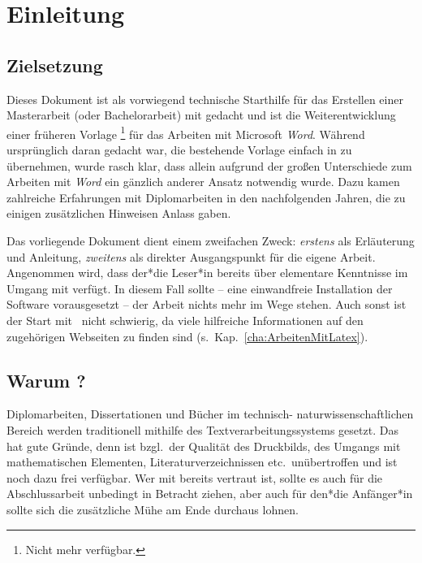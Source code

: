 \chapter{Einleitung}
\label{cha:Einleitung}


\section{Zielsetzung}

Dieses Dokument ist als vorwiegend technische Starthilfe für das Erstellen
einer Masterarbeit (oder Bachelorarbeit) mit \latex gedacht und ist die
Weiterentwicklung einer früheren Vorlage%
\footnote{Nicht mehr verfügbar.}
für das Arbeiten mit Microsoft \emph{Word}. Während ursprünglich daran
gedacht war, die bestehende Vorlage einfach in \latex zu übernehmen, wurde
rasch klar, dass allein aufgrund der großen Unterschiede zum Arbeiten mit
\emph{Word} ein gänzlich anderer Ansatz notwendig wurde. Dazu kamen
zahlreiche Erfahrungen mit Diplomarbeiten in den nachfolgenden Jahren, die zu
einigen zusätzlichen Hinweisen Anlass gaben.

Das vorliegende Dokument dient einem zweifachen Zweck: \emph{erstens} als
Erläuterung und Anleitung, \emph{zweitens} als direkter Ausgangspunkt für die
eigene Arbeit. Angenommen wird, dass der*die Leser*in bereits über elementare
Kenntnisse im Umgang mit \latex verfügt. In diesem Fall sollte -- eine
einwandfreie Installation der Software vorausgesetzt -- der Arbeit nichts
mehr im Wege stehen. Auch sonst ist der Start mit \latex\ nicht schwierig, da
viele hilfreiche Informationen auf den zugehörigen Webseiten zu finden sind
(s.\ Kap.~\ref{cha:ArbeitenMitLatex}).


\section{Warum {\latex}?}

Diplomarbeiten, Dissertationen und Bücher im technisch-%
natur\-wissen\-schaft\-lichen Bereich werden traditionell mithilfe
des Textverarbeitungssystems \latex \cite{Lamport1994, Lamport1995} gesetzt.
Das hat gute Gründe, denn \latex ist bzgl.\ der Qualität des Druckbilds, des
Umgangs mit mathematischen Elementen, Literaturverzeichnissen etc.\
unübertroffen und ist noch dazu frei verfügbar. Wer mit \latex bereits
vertraut ist, sollte es auch für die Abschlussarbeit unbedingt in Betracht
ziehen, aber auch für den*die Anfänger*in sollte sich die zusätzliche Mühe am
Ende durchaus lohnen.

